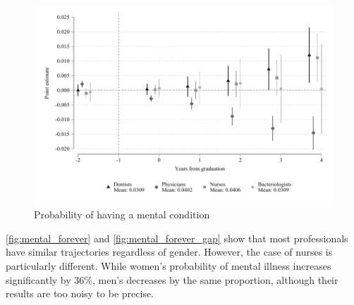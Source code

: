 \documentclass[12pt, a4paper]{article}
\begin{document}
\begin{figure}[H]
\caption{Probability of having a mental condition}\label{fig:mental_forever}
\centering 
\includegraphics[width=\textwidth]{Figures/Callaway SantAnna/ES_service_mental_forever_all.pdf}
\end{figure}

\autoref{fig:mental_forever} and \autoref{fig:mental_forever_gap} show that most professionals have similar trajectories regardless of gender. However, the case of nurses is particularly different. While women's probability of mental illness increases significantly by 36\%, men's decreases by the same proportion, although their results are too noisy to be precise.
\end{document}
